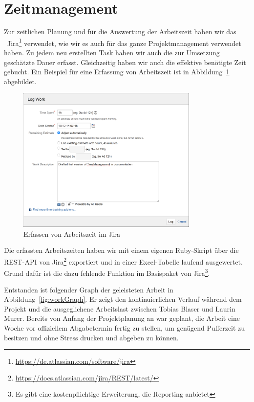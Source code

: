 \chapter*{Zeitmanagement}
	Zur zeitlichen Planung und für die Auswertung der Arbeitszeit haben wir das \ppt\ Jira\footnote{\url{https://de.atlassian.com/software/jira}} verwendet,
	wie wir es auch für das ganze Projektmanagement verwendet haben.
	Zu jedem neu erstellten Task haben wir auch die zur Umsetzung geschätzte Dauer erfasst.
	Gleichzeitig haben wir auch die effektive benötigte Zeit gebucht.
	Ein Beispiel für eine Erfassung von Arbeitszeit ist in Abbildung~\ref{fig:logWork} abgebildet.
	
	\begin{figure}[H]
		\includegraphics[width=0.8\textwidth]{projectPlan/media/img/logWork.png}
		\centering
		\caption{Erfassen von Arbeitszeit im Jira}
		\label{fig:logWork}
	\end{figure}
	
	Die erfassten Arbeitszeiten haben wir mit einem eigenen Ruby-Skript über die REST-API von Jira\footnote{\url{https://docs.atlassian.com/jira/REST/latest/}} exportiert
	und in einer Excel-Tabelle laufend ausgewertet.
	Grund dafür ist die dazu fehlende Funktion im Basispaket von Jira\footnote{Es gibt eine kostenpflichtige Erweiterung, die Reporting anbietet}.
	
	Entstanden ist folgender Graph der geleisteten Arbeit in Abbildung~\ref{fig:workGraph}.
	Er zeigt den kontinuierlichen Verlauf während dem Projekt
	und die ausgeglichene Arbeitslast zwischen Tobias Blaser und Laurin Murer.
	Bereits von Anfang der Projektplanung an war geplant, die Arbeit eine Woche vor offiziellem Abgabetermin fertig zu stellen, um genügend Pufferzeit zu besitzen und ohne Stress drucken und abgeben zu können.
	
